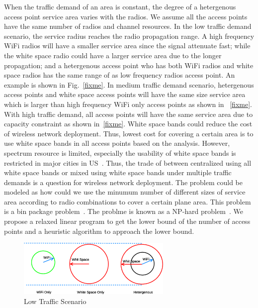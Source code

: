 When the traffic demand of an area is constant, the degree of a hetergenous access point service area 
varies with the radios. We assume all the access points have the same number of radios and channel 
resources.
In the low traffic demand scenario, the service radius reaches the radio propagation range.
A high frequency WiFi radios will have a smaller service area since the signal attenuate fast; while the white
space radio could have a larger service area due to the longer propagation; and a hetergenous access point who has
both WiFi radios and white space radios has the same range of as low frequency radios access point. An example is
shown in Fig.~\ref{fixme}.
In medium traffic demand scenario, hetergenous access points and white space access points will 
have the same size service area which is larger than high frequency WiFi only access points as shown in 
~\ref{fixme}.
With high traffic demand, all access points will have the same service area due to capacity constraint 
as shown in~\ref{fixme}. White space bands could reduce the cost of wireless network deployment. 
Thus, lowest cost for covering a certain area is to use white space bands in all access points 
based on the analysis. However, spectrum resource is limited, especially the usability
of white space bands is restricted in major cities in US~\cite{msdatabase}. 
Thus, the trade of between centralized using all white space bands or mixed using white space
bands under multiple traffic demands is a question for wireless network deployment. The problem
could be modeled as how could we use the minumum number of different sizes of service area according to 
radio combinations to cover a certain plane area. This problem is a bin package problem~\cite{fixme}.
The problme is known as a NP-hard problem~\cite{fixme}. We propose a relaxed linear program to 
get the lower bound of the number of access points and a heuristic algorithm to approach the 
lower bound.


\begin{figure}
\centering
\includegraphics[width=74mm]{figures/lowtraffic}
\vspace{-0.1in}
\caption{Low Traffic Scenario}                                                                 
\label{fig:drivemap}
\vspace{-0.1in}
\end{figure}

